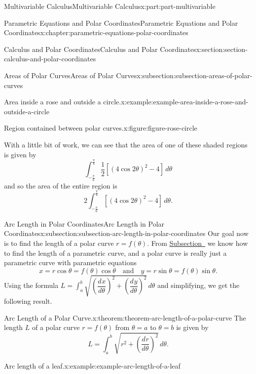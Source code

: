 \documentclass[twoside,10pt,]{book}
\numberwithin{equation}{part}
\newcommand{\dv}[3][]{\dfrac{d^{#1} #2}{d #3^{#1}}}
\begin{document}
\begin{partptx}{Multivariable Calculus}{}{Multivariable Calculus}{}{}{x:part:part-multivariable}
\begin{chapterptx}{Parametric Equations and Polar Coordinates}{}{Parametric Equations and Polar Coordinates}{}{}{x:chapter:parametric-equations-polar-coordinates}
\begin{sectionptx}{Calculus and Polar Coordinates}{}{Calculus and Polar Coordinates}{}{}{x:section:section-calculus-and-polar-coordinates}
\begin{subsectionptx}{Areas of Polar Curves}{}{Areas of Polar Curves}{}{}{x:subsection:subsection-areas-of-polar-curves}
\begin{example}{Area inside a rose and outside a circle.}{x:example:example-area-inside-a-rose-and-outside-a-circle}
\begin{figureptx}{Region contained between polar curves.}{x:figure:figure-rose-circle}{}
\begin{image}{0}{1}{0}
{\begin{tikzpicture}[scale=.5]
\end{tikzpicture}
}%
\end{image}%
\tcblower
\end{figureptx}%
With a little bit of work, we can see that the area of one of these shaded regions is given by%
%
\begin{equation*}
\int_{-\frac{\pi}{6}}^{\frac{\pi}{6}} \frac{1}{2}[(4\cos2\theta)^{2}-4]\,d\theta
\end{equation*}
and so the area of the entire region is%
%
\begin{equation*}
2\int_{-\frac{\pi}{6}}^{\frac{\pi}{6}}[(4\cos2\theta)^{2}-4]\,d\theta.
\end{equation*}
\end{example}
\end{subsectionptx}
%
%
\typeout{************************************************}
\typeout{************************************************}
%
\begin{subsectionptx}{Arc Length in Polar Coordinates}{}{Arc Length in Polar Coordinates}{}{}{x:subsection:subsection-arc-length-in-polar-coordinates}
Our goal now is to find the length of a polar curve \(r=f(\theta)\). From \hyperref[x:subsection:subsection-arc-length-parametric-curves]{Subsection~} we know how to find the length of a parametric curve, and a polar curve is really just a parametric curve with parametric equations%
%
\begin{equation*}
x = r\cos\theta = f(\theta)\cos\theta \quad\text{and}\quad y = r\sin\theta = f(\theta)\sin\theta.
\end{equation*}
Using the formula \(L = \int_{a}^{b}\sqrt{(\dv{x}{\theta})^{2}+(\dv{y}{\theta})^{2}}\,d\theta\) and simplifying, we get the following result.%
\begin{theorem}{Arc Length of a Polar Curve.}{}{x:theorem:theorem-arc-length-of-a-polar-curve}%
%
The length \(L\) of a polar curve \(r = f(\theta)\) from \(\theta=a\) to \(\theta=b\) is given by%
\begin{equation*}
L = \int_{a}^{b}\sqrt{r^{2} + \left(\dv{r}{\theta}\right)^{2}}\,d\theta.
\end{equation*}
%
\end{theorem}
\begin{example}{Arc length of a leaf.}{x:example:example-arc-length-of-a-leaf}%

\end{example}
\end{subsectionptx}
\end{sectionptx}
\end{chapterptx}
\end{partptx}
\end{document}
